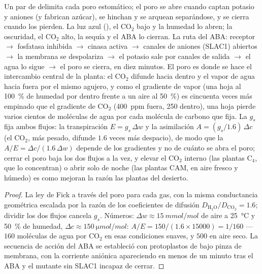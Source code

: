 \begin{proposition}\label{prop:b3:plant-molecular-physiology:stomata}
Un par de \emph{} delimita cada poro estomático; el
poro se abre cuando captan potasio y aniones (y fabrican azúcar), se
hinchan y se arquean separándose, y se cierra cuando los pierden. La
luz azul (), el CO$_{2}$ bajo y la humedad lo abren; la
oscuridad, el CO$_{2}$ alto, la sequía y el ABA lo cierran. La ruta del
ABA: receptor $\to$ fosfatasa inhibida $\to$ cinasa activa $\to$
canales de aniones (SLAC1) abiertos $\to$ la membrana se despolariza
$\to$ el potasio sale por canales de salida $\to$ el agua lo sigue
$\to$ el poro se cierra, en diez minutos. El poro es donde se hace el
intercambio central de la planta: el CO$_{2}$ difunde hacia dentro y el
vapor de agua hacia fuera por el mismo agujero, y como el gradiente de
vapor (una hoja al \qty{100}{\%} de humedad por dentro frente a un aire
al \qty{50}{\%}) es cincuenta veces más empinado que el gradiente de
CO$_{2}$ (\qty{400}{ppm} fuera, \qty{250}{} dentro), una hoja pierde
varios cientos de moléculas de agua por cada molécula de carbono que
fija. La \emph{} $g_{s}$ fija ambos flujos: la
transpiración $E = g_{s}\,\Delta w$ y la asimilación
$A = (g_{s}/1.6)\,\Delta c$ (el CO$_{2}$, más pesado, difunde $1.6$
veces más despacio), de modo que la \emph{} $A/E = \Delta c/(1.6\,\Delta w)$ depende de los gradientes y no
de cuánto se abra el poro; cerrar el poro baja los dos flujos a la vez,
y elevar el CO$_{2}$ interno (las plantas C$_{4}$, que lo concentran) o
abrir solo de noche (las plantas CAM, en aire fresco y húmedo) es como
mejoran la razón las plantas del desierto.
\end{proposition}
\begin{proof}
La ley de Fick a través del poro para cada gas, con la misma
conductancia geométrica escalada por la razón de los coeficientes de
difusión $D_{\mathrm{H_2O}}/D_{\mathrm{CO_2}} = 1.6$; dividir los dos
flujos cancela $g_{s}$. Números: $\Delta w \approx \qty{15}{mmol/mol}$
de aire a \qty{25}{\celsius} y \qty{50}{\%} de humedad, $\Delta c \approx
\qty{150}{\micro mol/mol}$: $A/E = 150/(1.6\times\num{15000}) = 1/160$
---$160$ moléculas de agua por CO$_{2}$ en esas condiciones suaves, y
$500$ en aire seco. La secuencia de acción del ABA se estableció con
protoplastos de  bajo pinza de membrana, con la
corriente aniónica apareciendo en menos de un minuto tras el ABA y el
mutante sin SLAC1 incapaz de cerrar.
\end{proof}

